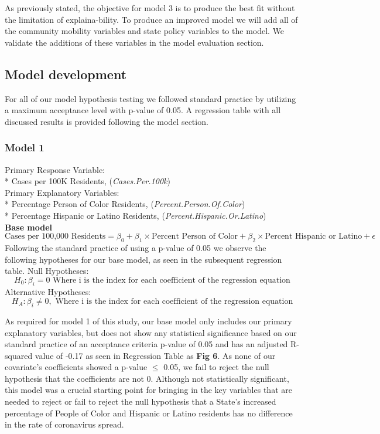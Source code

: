 \documentclass[
]{article}
\begin{document}
As previously stated, the objective for model 3 is to produce the best
fit without the limitation of explaina-bility. To produce an improved
model we will add all of the community mobility variables and state
policy variables to the model. We validate the additions of these
variables in the model evaluation section.

\hypertarget{model-development}{%
\subsection{Model development}\label{model-development}}

For all of our model hypothesis testing we followed standard practice by
utilizing a maximum acceptance level with p-value of 0.05. A regression
table with all discussed results is provided following the model
section.

\hypertarget{model-1}{%
\subsubsection{Model 1}\label{model-1}}

Primary Response Variable:\\
* Cases per 100K Residents, (\emph{Cases.Per.100k})\\
Primary Explanatory Variables:\\
* Percentage Person of Color Residents,
(\emph{Percent.Person.Of.Color})\\
* Percentage Hispanic or Latino Residents,
(\emph{Percent.Hispanic.Or.Latino})\\

\textbf{Base model}
\[ \text{Cases per 100,000 Residents} = \beta_0 + \beta_1\times\text{Percent Person of Color} + \beta_2 \times \text{Percent Hispanic or Latino} + \epsilon \]
Following the standard practice of using a p-value of 0.05 we observe
the following hypotheses for our base model, as seen in the subsequent
regression table. Null Hypotheses:
\[H_0 : \beta_i = 0 \text{ Where i is the index for each coefficient of the regression equation}\]
Alternative Hypotheses:
\[H_A : \beta_i \neq 0, \text{ Where i is the index for each coefficient of the regression equation}\]

As required for model 1 of this study, our base model only includes our
primary explanatory variables, but does not show any statistical
significance based on our standard practice of an acceptance criteria
p-value of 0.05 and has an adjusted R-squared value of -0.17 as seen in
Regression Table as \textbf{Fig 6}. As none of our covariate's
coefficients showed a p-value \(\leq\) 0.05, we fail to reject the null
hypothesis that the coefficients are not 0. Although not statistically
significant, this model was a crucial starting point for bringing in the
key variables that are needed to reject or fail to reject the null
hypothesis that a State's increased percentage of People of Color and
Hispanic or Latino residents has no difference in the rate of
coronavirus spread.
\end{document}
